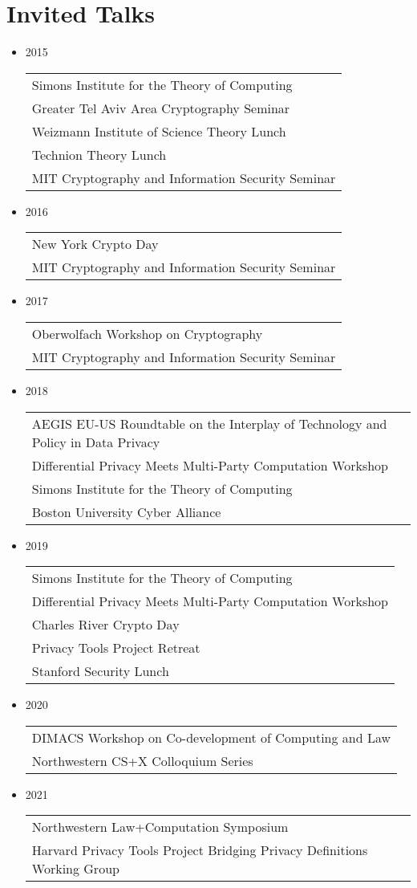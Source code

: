 

\newcommand{\cvtalk}[2]{\item {#1}
\begin{tabular}[t]{l@{}}#2\end{tabular}}

\section{Invited Talks}

\begin{itemize}[label={}]
  

\cvtalk{2015}{Simons Institute for the Theory of Computing \\ Greater Tel Aviv Area Cryptography Seminar \\ Weizmann Institute of Science Theory Lunch \\ Technion Theory Lunch \\ MIT Cryptography and Information Security Seminar}

\cvtalk{2016}{New York Crypto Day \\ MIT Cryptography and Information Security Seminar}

\cvtalk{2017}{Oberwolfach Workshop on Cryptography \\ MIT Cryptography and Information Security Seminar}


\cvtalk{2018}%
{AEGIS EU-US Roundtable on the Interplay of Technology and Policy in Data Privacy \\
Differential Privacy Meets Multi-Party Computation Workshop \\
Simons Institute for the Theory of Computing \\ %
Boston University Cyber Alliance}

\cvtalk{2019}%
{Simons Institute for the Theory of Computing \\ %
Differential Privacy Meets Multi-Party Computation Workshop \\
Charles River Crypto Day \\
Privacy Tools Project Retreat \\
Stanford Security Lunch }


\cvtalk{2020}%
{DIMACS Workshop on Co-development of Computing and Law \\ Northwestern CS+X Colloquium Series}

\cvtalk{2021}%
{Northwestern Law+Computation Symposium \\
Harvard Privacy Tools Project Bridging Privacy Definitions Working Group}


\end{itemize}

